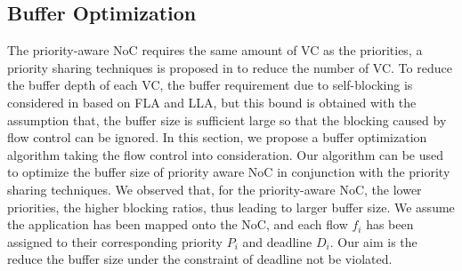 \documentclass[10pt,journal]{IEEEtran}
\begin{document}
\subsection{Buffer Optimization}
The priority-aware NoC requires the same amount of VC as the priorities, a priority sharing techniques is proposed in \cite{5161497} to reduce the number of VC. To reduce the buffer depth of each VC, the buffer requirement due to self-blocking is considered in \cite{189} based on FLA and LLA, but this bound is obtained with the assumption that, the buffer size is sufficient large so that the blocking caused by flow control can be ignored. In this section, we propose a buffer optimization algorithm taking the flow control into consideration. Our algorithm can be used to optimize the buffer size of priority aware NoC in conjunction with the priority sharing techniques. We observed that, for the priority-aware NoC, the lower priorities, the higher blocking ratios, thus leading to larger buffer size. We assume the application has been mapped onto the NoC, and each flow $f_i$ has been assigned to their corresponding priority $P_i$ and deadline $D_i$. Our aim is the reduce the buffer size under the constraint of deadline not be violated.
\end{document}
